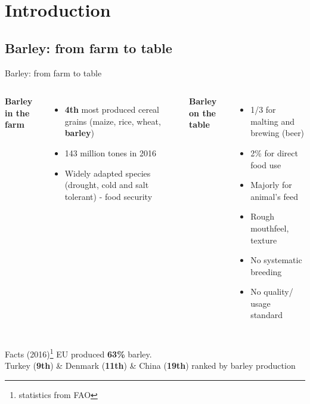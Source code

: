 \documentclass{beamer}
\begin{document}
\section{Introduction}
\subsection{Barley: from farm to table}
\begin{frame}{Barley: from farm to table}

\begin{columns}[T]
\textbf{Barley in the farm}
\begin{itemize}
\item \textbf{4th} most produced cereal grains (maize, rice, wheat, \textbf{barley})
\item 143 million tones in 2016
\item Widely adapted species (drought, cold and salt tolerant) - food security
\end{itemize}
 
\textbf{Barley on the table}
\begin{itemize}
\item 1/3 for malting and brewing (beer)
\item 2\%  for direct food use
\item Majorly for animal's feed
\newline
\item Rough mouthfeel, texture
\item No systematic breeding
\item No quality/ usage standard
\end{itemize}
\end{columns}

\vskip 0.3cm

\begin{block}{Facts (2016)\footnote{statistics from FAO}}
EU produced \textbf{63\%} barley.\\Turkey (\textbf{9th}) \& Denmark (\textbf{11th})  \& China (\textbf{19th}) ranked by barley production 
\end{block}

\end{frame}
\end{document}
